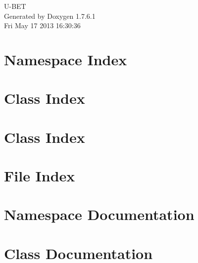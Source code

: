 \documentclass[a4paper]{book}
\begin{document}
\hypersetup{pageanchor=false,citecolor=blue}
\begin{titlepage}
\vspace*{7cm}
\begin{center}
{\Large \-U-\/\-B\-E\-T }\\
\vspace*{1cm}
{\large \-Generated by Doxygen 1.7.6.1}\\
\vspace*{0.5cm}
{\small Fri May 17 2013 16:30:36}\\
\end{center}
\end{titlepage}
\clearemptydoublepage
{}
\tableofcontents
\clearemptydoublepage
{}
\hypersetup{pageanchor=true,citecolor=blue}
\chapter{\-Namespace \-Index}

\chapter{\-Class \-Index}

\chapter{\-Class \-Index}

\chapter{\-File \-Index}

\chapter{\-Namespace \-Documentation}


\chapter{\-Class \-Documentation}


























\end{document}
